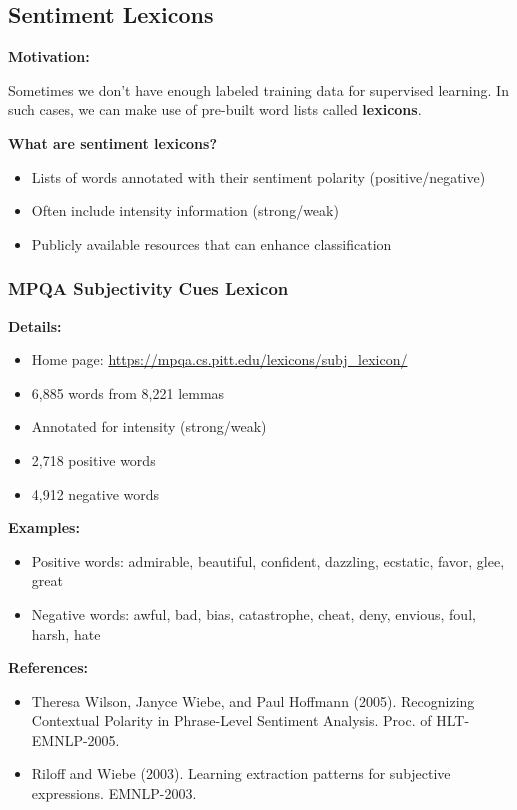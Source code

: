 \documentclass[11pt,a4paper]{article}
\theoremstyle{definition}
\theoremstyle{plain}
\theoremstyle{remark}
\begin{document}
\subsection{Sentiment Lexicons}

\textbf{Motivation:}

Sometimes we don't have enough labeled training data for supervised learning. In such cases, we can make use of pre-built word lists called \textbf{lexicons}.

\textbf{What are sentiment lexicons?}
\begin{itemize}
    \item Lists of words annotated with their sentiment polarity (positive/negative)
    \item Often include intensity information (strong/weak)
    \item Publicly available resources that can enhance classification
\end{itemize}

\subsubsection{MPQA Subjectivity Cues Lexicon}

\textbf{Details:}
\begin{itemize}
    \item Home page: \url{https://mpqa.cs.pitt.edu/lexicons/subj_lexicon/}
    \item 6,885 words from 8,221 lemmas
    \item Annotated for intensity (strong/weak)
    \item 2,718 positive words
    \item 4,912 negative words
\end{itemize}

\textbf{Examples:}
\begin{itemize}
    \item Positive words: admirable, beautiful, confident, dazzling, ecstatic, favor, glee, great
    \item Negative words: awful, bad, bias, catastrophe, cheat, deny, envious, foul, harsh, hate
\end{itemize}

\textbf{References:}
\begin{itemize}
    \item Theresa Wilson, Janyce Wiebe, and Paul Hoffmann (2005). Recognizing Contextual Polarity in Phrase-Level Sentiment Analysis. Proc. of HLT-EMNLP-2005.
    \item Riloff and Wiebe (2003). Learning extraction patterns for subjective expressions. EMNLP-2003.
\end{itemize}
\end{document}
